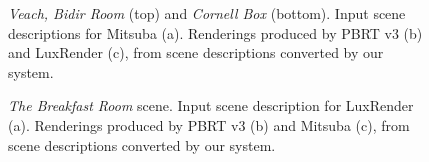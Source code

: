 \begin{figure}
{}	
\caption{\textit{Veach, Bidir Room} (top) and \textit{Cornell Box} (bottom). Input scene descriptions for 
 Mitsuba (a). Renderings produced by PBRT v3 (b) and LuxRender (c),
 from scene descriptions converted by our system.}
\label{fig:veach-bidir}
\end{figure}

\begin{figure}
\centering
{}	
\caption{\textit{The Breakfast Room} scene. Input scene description for LuxRender (a).
	Renderings produced by PBRT v3 (b) and Mitsuba (c),
	from scene descriptions converted by our system. }
\label{fig:dining-room}
\end{figure}

